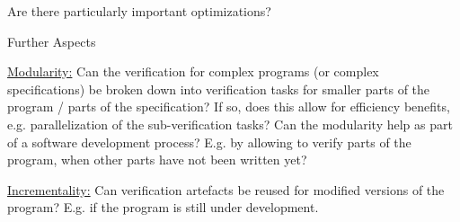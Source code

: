 \documentclass[a4paper]{article}
\begin{document}
\begin{minipage}[t]{0.16\linewidth}
\begin{betterlist}
\begin{betterlist}
			\item Are there particularly important optimizations?

		\end{betterlist}
		\item \alert{Further Aspects}
		\begin{betterlist}
			\item \underline{Modularity:} Can the verification for complex programs (or complex specifications) be broken down into verification tasks for smaller parts of the program / parts of the specification? If so, does this allow for efficiency benefits, e.g. parallelization of the sub-verification tasks? Can the modularity help as part of a software development process? E.g. by allowing to verify parts of the program, when other parts have not been written yet?

			\item \underline{Incrementality:} Can verification artefacts be reused for modified versions of the program? E.g. if the program is still under development.


\end{betterlist}
\end{betterlist}
\end{minipage}
\end{document}
